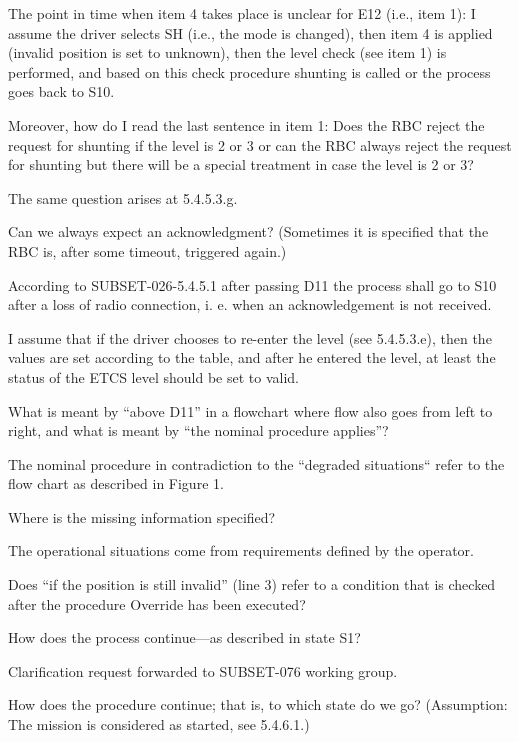 \documentclass{template/openetcs_article}
\begin{document}
\label{i:s10}
The point in time when item 4 takes place is unclear for E12 (i.e., item 1): I assume the driver selects SH (i.e., the mode is changed), then item 4 is applied (invalid position is set to unknown), then the level check (see item 1) is performed, and based on this check procedure shunting is called or the process goes back to S10. 

Moreover, how do I read the last sentence in item 1: Does the RBC reject the request for shunting if the level is 2 or 3 or can the RBC always reject the request for shunting but there will be a special treatment in case the level is 2 or 3? 

The same question arises at 5.4.5.3.g.

Can we always expect an acknowledgment? (Sometimes it is specified that the RBC is, after some timeout, triggered again.) 

\resolution According to SUBSET-026-5.4.5.1 after passing D11 the process shall go to S10 after a loss of radio connection, i. e. when an acknowledgement is not received.

I assume that if the driver chooses to re-enter the level (see 5.4.5.3.e), then the values are set according to the table, and after he entered the level, at least the status of the ETCS level should be set to valid.

What is meant by ``above D11'' in a flowchart where flow also goes from left to right, and what is meant by ``the nominal procedure applies''?

\resolution The nominal procedure in contradiction to the  ``degraded situations`` refer to the flow chart as described in Figure 1.

Where is the missing information specified?

\resolution The operational situations come from requirements defined by the operator.

Does ``if the position is still invalid'' (line 3) refer to a condition that is checked after the procedure Override has been executed?



How does the process continue---as described in state S1?

\resolution Clarification request forwarded to SUBSET-076 working group.

How does the procedure continue; that is, to which state do we go? (Assumption: The mission is considered as started, see 5.4.6.1.) 
\end{document}
